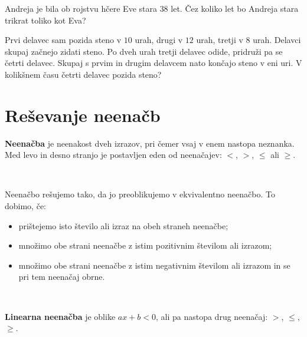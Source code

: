         


        
            \begin{naloga}
                Andreja je bila ob rojstvu hčere Eve stara $38$ let. Čez koliko let bo Andreja stara trikrat toliko kot Eva?
                
            \end{naloga}

            \begin{naloga}
                Prvi delavec sam pozida steno v  $10$ urah, drugi v $12$ urah, tretji v $8$ urah. 
                Delavci skupaj začnejo zidati steno. Po dveh urah tretji delavec odide, pridruži pa se četrti delavec. 
                Skupaj s prvim in drugim delavcem nato končajo steno v eni uri. V kolikšnem času četrti delavec pozida steno?
                
            \end{naloga}

        




            \newpage
    \section{Reševanje neenačb}

        

                \textbf{Neenačba} je neenakost dveh izrazov, pri čemer vsaj v enem nastopa neznanka.
                Med levo in desno stranjo je postavljen eden od neenačajev: $<$, $>$, $\leq$ ali $\geq$.

                ~

                Neenačbo rešujemo tako, da jo preoblikujemo v ekvivalentno neenačbo. To dobimo, če:
                \begin{itemize}
                    \item prištejemo isto število ali izraz na obeh straneh neenačbe;
                    \item množimo obe strani neenačbe z istim pozitivnim številom ali izrazom;
                    \item množimo obe strani neenačbe z istim negativnim številom ali izrazom in se pri tem neenačaj obrne.
                \end{itemize}
            
                ~
            
                \textbf{Linearna neenačba} je oblike $ax+b<0$, ali pa nastopa drug neenačaj: $>$, $\leq$, $\geq$.
            
